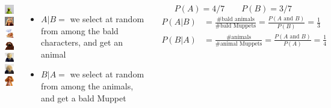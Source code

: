 \documentclass{beamer}\usepackage[]{graphicx}\usepackage[]{color}
\begin{document}
\begin{darkframes}
\begin{frame}
  \begin{columns}[onlytextwidth]
      \includegraphics[width=0.45in]{kermitthefrog} \\
      \includegraphics[width=0.45in]{misspiggy} \\
      \includegraphics[width=0.45in]{swedishchef} \\
      \includegraphics[width=0.45in]{rowlf} \\
      \includegraphics[width=0.45in]{statler} \\
      \includegraphics[width=0.45in]{waldorf} \\
      \includegraphics[width=0.45in]{fozziebear} \\
    \begin{itemize}
      \item $A|B = $ we select at random from among the bald characters, and get an animal
      \item $B|A = $ we select at random from among the animals, and get a bald Muppet
    \end{itemize}
    \[
      P(A) = 4/7 \qquad P(B) = 3/7
    \]
    \pause
    \begin{align*}
      P(A|B) &= \frac{\text{\# bald animals}}{\text{\# bald Muppets}} = \frac{P(\text{$A$ and $B$})}{P(B)} = \frac 1 3 \\
      P(B|A) &= \frac{\text{\# animals}}{\text{\# animal Muppets}} = \frac{P(\text{$A$ and $B$})}{P(A)} = \frac 1 4 \\
    \end{align*}
  \end{columns}
\end{frame}


\end{darkframes}
\end{document}
